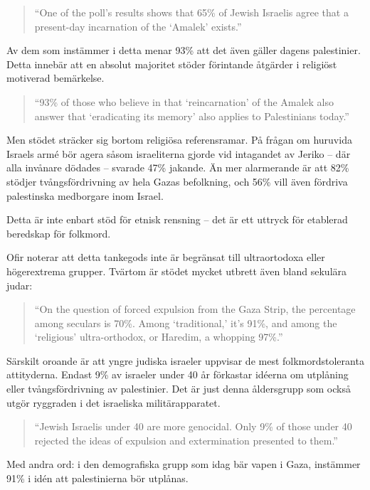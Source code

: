 \documentclass[12pt]{article}
\begin{document}
\begin{quote}
“One of the poll’s results shows that 65\% of Jewish Israelis agree that a present-day incarnation of the ‘Amalek’ exists.”
\end{quote}

Av dem som instämmer i detta menar 93\% att det även gäller dagens palestinier. Detta innebär att en absolut majoritet stöder förintande åtgärder i religiöst motiverad bemärkelse.

\begin{quote}
“93\% of those who believe in that ‘reincarnation’ of the Amalek also answer that ‘eradicating its memory’ also applies to Palestinians today.”
\end{quote}

Men stödet sträcker sig bortom religiösa referensramar. På frågan om huruvida Israels armé bör agera såsom israeliterna gjorde vid intagandet av Jeriko – där alla invånare dödades – svarade 47\% jakande. Än mer alarmerande är att 82\% stödjer tvångsfördrivning av hela Gazas befolkning, och 56\% vill även fördriva palestinska medborgare inom Israel.

Detta är inte enbart stöd för etnisk rensning – det är ett uttryck för etablerad beredskap för folkmord.

Ofir noterar att detta tankegods inte är begränsat till ultraortodoxa eller högerextrema grupper. Tvärtom är stödet mycket utbrett även bland sekulära judar:

\begin{quote}
“On the question of forced expulsion from the Gaza Strip, the percentage among seculars is 70\%. Among ‘traditional,’ it’s 91\%, and among the ‘religious’ ultra-orthodox, or Haredim, a whopping 97\%.”
\end{quote}

Särskilt oroande är att yngre judiska israeler uppvisar de mest folkmordstoleranta attityderna. Endast 9\% av israeler under 40 år förkastar idéerna om utplåning eller tvångsfördrivning av palestinier. Det är just denna åldersgrupp som också utgör ryggraden i det israeliska militärapparatet.

\begin{quote}
“Jewish Israelis under 40 are more genocidal. Only 9\% of those under 40 rejected the ideas of expulsion and extermination presented to them.”
\end{quote}

Med andra ord: i den demografiska grupp som idag bär vapen i Gaza, instämmer 91\% i idén att palestinierna bör utplånas.
\end{document}
